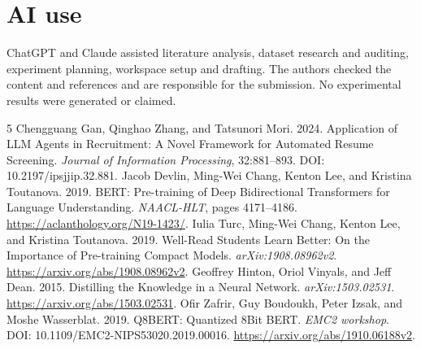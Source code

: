 \documentclass[11pt]{article}
\begin{document}
\section{AI use}
ChatGPT and Claude assisted literature analysis, dataset research and auditing, experiment planning, workspace setup and drafting. The authors checked the content and references and are responsible for the submission. No experimental results were generated or claimed.

\begin{thebibliography}{5}
 Chengguang Gan, Qinghao Zhang, and Tatsunori Mori. 2024. Application of LLM Agents in Recruitment: A Novel Framework for Automated Resume Screening. \emph{Journal of Information Processing}, 32:881--893. DOI: 10.2197/ipsjjip.32.881.
 Jacob Devlin, Ming-Wei Chang, Kenton Lee, and Kristina Toutanova. 2019. BERT: Pre-training of Deep Bidirectional Transformers for Language Understanding. \emph{NAACL-HLT}, pages 4171--4186. \url{https://aclanthology.org/N19-1423/}.
 Iulia Turc, Ming-Wei Chang, Kenton Lee, and Kristina Toutanova. 2019. Well-Read Students Learn Better: On the Importance of Pre-training Compact Models. \emph{arXiv:1908.08962v2}. \url{https://arxiv.org/abs/1908.08962v2}.
 Geoffrey Hinton, Oriol Vinyals, and Jeff Dean. 2015. Distilling the Knowledge in a Neural Network. \emph{arXiv:1503.02531}. \url{https://arxiv.org/abs/1503.02531}.
 Ofir Zafrir, Guy Boudoukh, Peter Izsak, and Moshe Wasserblat. 2019. Q8BERT: Quantized 8Bit BERT. \emph{EMC2 workshop}. DOI: 10.1109/EMC2-NIPS53020.2019.00016. \url{https://arxiv.org/abs/1910.06188v2}.
\end{thebibliography}
\end{document}
